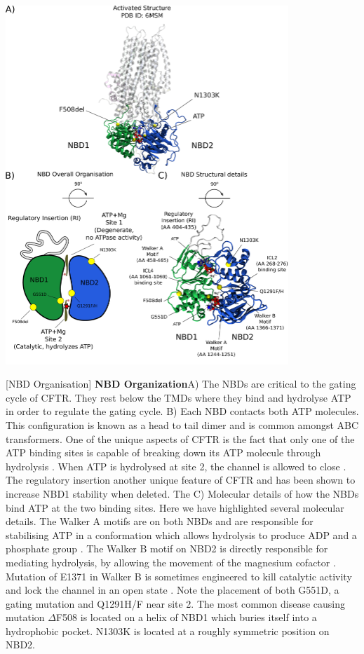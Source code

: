 	\begin{center}
	\includegraphics[width=0.8\textwidth]{figures/ATP_head_to_tail_figure.pdf}
	\end{center}
	\begingroup
	[NBD Organisation] {\textbf{NBD Organization}}{A) The NBDs are critical to the gating cycle of CFTR. They rest below the TMDs where they bind and hydrolyse ATP in order to regulate the gating cycle. B) Each NBD contacts both ATP molecules. This configuration is known as a head to tail dimer and is common amongst ABC transformers. One of the unique aspects of CFTR is the fact that only one of the ATP binding sites is capable of breaking down its ATP molecule through hydrolysis \cite{stratford2007}. When ATP is hydrolysed at site 2, the channel is allowed to close \cite{infield2021}. The regulatory insertion another unique feature of CFTR and has been shown to increase NBD1 stability when deleted. The  C) Molecular details of how the NBDs bind ATP at the two binding sites. Here we have highlighted several molecular details. The Walker A motifs are on both NBDs and are responsible for stabilising ATP in a conformation which allows hydrolysis to produce ADP and a phosphate group \cite{deltoro2016}. The Walker B motif on NBD2 is directly responsible for mediating hydrolysis, by allowing the movement of the magnesium cofactor \cite{urbatsch2000, rai2006}. Mutation of E1371 in Walker B is sometimes engineered to kill catalytic activity and lock the channel in an open state \cite{stratford2007, zhang2018}. Note the placement of both G551D, a gating mutation and Q1291H/F near site 2. The most common disease causing mutation $\Delta$F508 is located on a helix of NBD1 which buries itself into a hydrophobic pocket. N1303K is located at a roughly symmetric position on NBD2. } 

